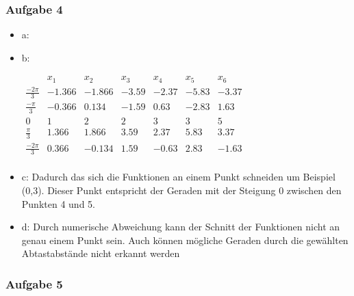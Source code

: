 \documentclass{article}
\begin{document}
\subsubsection{Aufgabe 4}
	\begin{itemize}
		\item a:
		\begin{figure}[h]
		\end{figure}
		
		\item b:
	
		$ \begin{matrix}
			& x_1 & x_2 & x_3 & x_4 & x_5 & x_6 \\
			\frac{-2\pi}{3} &-1.366 & -1.866 & -3.59 & -2.37 & -5.83 & -3.37 \\
			\frac{-\pi}{3}&-0.366 & 0.134 & -1.59 & 0.63 & -2.83 & 1.63 \\
			0&1 & 2 & 2 & 3 & 3 & 5 \\
			\frac{\pi}{3}&1.366 & 1.866 & 3.59 & 2.37 & 5.83 & 3.37 \\
			\frac{-2\pi}{3} &0.366 & -0.134 & 1.59 & -0.63 & 2.83 & -1.63 \\
				
		\end{matrix}$
		
		\item c: Dadurch das sich die Funktionen an einem Punkt schneiden um Beispiel (0,3). Dieser Punkt entspricht der Geraden mit der Steigung 0 zwischen den Punkten 4 und 5. 
		 		
		\item d: Durch numerische Abweichung kann der Schnitt der Funktionen nicht an genau einem Punkt sein. Auch können mögliche Geraden durch die gewählten Abtastabstände nicht erkannt werden
	\end{itemize}

\subsubsection{Aufgabe 5}
\end{document}
